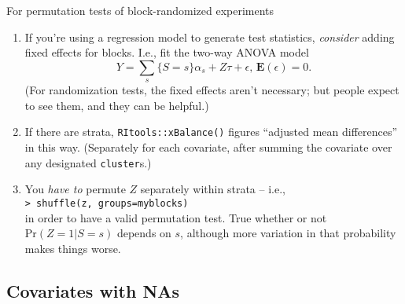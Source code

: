 \itnote{
\item 
}



\begin{frame}{For permutation tests of block-randomized experiments}
  
  \begin{enumerate}
  \item If you're using a regression model to generate test
    statistics, \textit{consider} adding fixed effects for blocks.  I.e., fit
    the two-way ANOVA model
$$
Y = \sum_{s}\{S=s\}\alpha_{s} + Z\tau + \epsilon,\, \mathbf{E}(\epsilon) = 0.
$$
 (For randomization tests, the fixed effects aren't necessary; but
 people expect to see them, and they can be helpful.)
\item If there are strata, \texttt{RItools::xBalance()} figures
  ``adjusted mean differences'' in this way.  (Separately
  for each covariate, after summing the covariate over any designated \texttt{cluster}s.)
  \item  You \textit{have to} permute $Z$ separately within strata -- i.e.,\\
\texttt{> shuffle(z, groups=myblocks)}\\
in order to have a  valid permutation test. True whether or not $\mathrm{Pr}(Z=1|S=s)$ depends on $s$, although more variation in that probability makes things worse.
  \end{enumerate}




\end{frame}

\subsection{Covariates with NAs}

